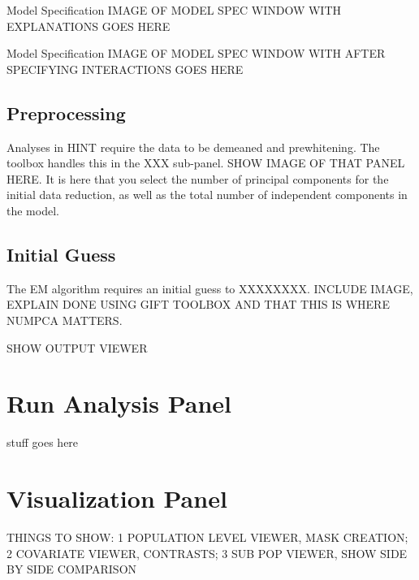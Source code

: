 \documentclass[11pt]{beamer}
\begin{document}
\begin{frame}{Model Specification}
IMAGE OF MODEL SPEC WINDOW WITH EXPLANATIONS GOES HERE
\end{frame}


\begin{frame}{Model Specification}
IMAGE OF MODEL SPEC WINDOW WITH AFTER SPECIFYING INTERACTIONS GOES HERE
\end{frame}

\subsection{Preprocessing}

\begin{frame}
Analyses in HINT require the data to be demeaned and prewhitening. The toolbox handles this in the XXX sub-panel. SHOW IMAGE OF THAT PANEL HERE. It is here that you select the number of principal components for the initial data reduction, as well as the total number of independent components in the model.
\end{frame}

\subsection{Initial Guess}

\begin{frame}
The EM algorithm requires an initial guess to XXXXXXXX. INCLUDE IMAGE, EXPLAIN DONE USING GIFT TOOLBOX AND THAT THIS IS WHERE NUMPCA MATTERS.
\end{frame}

\begin{frame}
SHOW OUTPUT VIEWER
\end{frame}

\section{Run Analysis Panel}

\begin{frame}
stuff goes here
\end{frame}

\section{Visualization Panel}

\begin{frame}
THINGS TO SHOW: 1 POPULATION LEVEL VIEWER, MASK CREATION; 2 COVARIATE VIEWER, CONTRASTS; 3 SUB POP VIEWER, SHOW SIDE BY SIDE COMPARISON
\end{frame}
\end{document}
